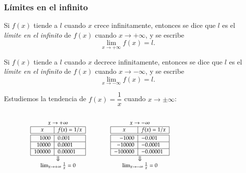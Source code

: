 \begin{frame}
	\frametitle{Límites en el infinito}
	Si $f(x)$ tiende a $l$ cuando $x$ crece infinitamente, entonces se dice que $l$ es el \emph{límite en el infinito} de $f(x)$ cuando $x\rightarrow +\infty$, y se escribe
	\[\lim_{x\rightarrow +\infty}f(x)=l.\]
	
	Si $f(x)$ tiende a $l$ cuando $x$ decrece infinitamente, entonces se dice que $l$ es el \emph{límite en el infinito} de $f(x)$ cuando $x\rightarrow -\infty$, y se escribe
	\[\lim_{x\rightarrow -\infty}f(x)=l.\]
	
	 Estudiemos la tendencia de $f(x)=\dfrac{1}{x}$ cuando $x\rightarrow \pm\infty$:
	\begin{columns}
		\begin{column}{0.6\textwidth}
			\[
				\footnotesize
				\begin{array}{ccc}
					x\rightarrow +\infty & \qquad & x\rightarrow -\infty \\
					\begin{array}{|r|l|}
					\hline
					\multicolumn{1}{|c|}{x}      & \multicolumn{1}{c|}{f(x)=1/x}   \\
					\hline\hline
					1000    & 0.001       \\
					\hline
					10000   & 0.0001     \\
					\hline
					100000  & 0.00001   \\
					\hline
				\end{array}
				& &
				\begin{array}{|r|l|}
					\hline
					\multicolumn{1}{|c|}{x} & \multicolumn{1}{c|}{f(x)=1/x} \\
					\hline\hline
					-1000                   & -0.001                        \\
					\hline
					-10000                  & -0.0001                       \\
					\hline
					-100000                 & -0.00001                      \\
					\hline
				\end{array}\\
				\Downarrow & & \Downarrow\\
				\lim_{x\rightarrow +\infty}\frac{1}{x}=0
				& &
				\lim_{x\rightarrow -\infty}\frac{1}{x}=0
				\end{array}
			\]
		\end{column}
		\begin{column}{0.4\textwidth}
			\begin{center}
				\scalebox{1}{}
			\end{center}
		\end{column}
	\end{columns}
\end{frame}



